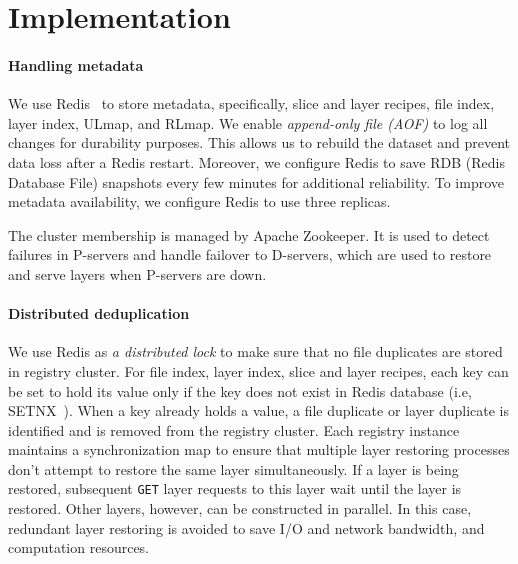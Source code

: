 \section{Implementation}
\label{sec:impl}

\paragraph{Handling metadata}
We use Redis~\cite{redis} to store metadata, specifically,
slice and layer recipes, file index, layer index, ULmap, and RLmap.
We enable \emph{append-only file (AOF)} to log all changes for durability purposes.
This allows us to rebuild the dataset and prevent data loss after a Redis restart.
Moreover, we configure Redis to save RDB (Redis Database File) snapshots every few minutes for additional reliability.
To improve metadata availability, we configure Redis to use three replicas.

The cluster membership is managed by Apache Zookeeper.
It is used to detect failures in P-servers and handle failover to D-servers, 
which are used to restore and serve layers when P-servers are down.

\paragraph{Distributed deduplication}
We use Redis as \emph{a distributed lock}
to make sure that no file duplicates are stored in registry cluster.
For file index, layer index, slice and layer recipes,
each key can be set to hold its value only if
the key does not exist in Redis database (i.e, SETNX~\cite{SETNX}).
When a key already holds a value, a file duplicate or
layer duplicate is identified and is removed from the registry cluster.
%
Each registry instance maintains a synchronization map
to ensure that multiple layer restoring processes
don't attempt to restore the same layer simultaneously.
If a layer is being restored, subsequent
\texttt{GET} layer requests to this layer wait until the layer is restored.
Other layers, however, can be constructed in parallel.
In this case, redundant layer restoring is avoided to save I/O and network bandwidth, and computation resources.
 
